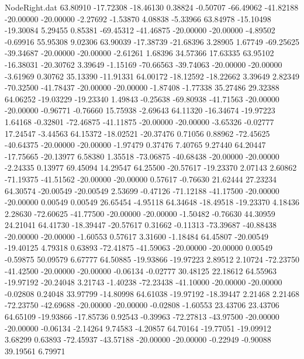 \begin{filecontents}{NodeRight.dat}
  63.80910  -17.72308  -18.46130     0.38824   -0.50707  -66.49062  -41.82188  -20.00000  -20.00000   -2.27692   -1.53870    4.08838   -5.33966
  63.84978  -15.10498  -19.30084     5.29455    0.85381  -69.45312  -41.46875  -20.00000  -20.00000   -4.89502   -0.69916   55.95308    9.02306
  63.90039  -17.38739  -21.68396     3.28905    1.67749  -69.25625  -39.34687  -20.00000  -20.00000   -2.61261    1.68396   34.57366   17.63335
  63.95102  -16.38031  -20.30762     3.39649   -1.15169  -70.66563  -39.74063  -20.00000  -20.00000   -3.61969    0.30762   35.13390  -11.91331
  64.00172  -18.12592  -18.22662     3.39649    2.82349  -70.32500  -41.78437  -20.00000  -20.00000   -1.87408   -1.77338   35.27486   29.32388
  64.06252  -19.03229  -19.23340     1.49843   -0.25638  -69.80938  -41.71563  -20.00000  -20.00000   -0.96771   -0.76660   15.75938   -2.69643
  64.11320  -16.34674  -19.97223     1.64168   -0.32801  -72.46875  -41.11875  -20.00000  -20.00000   -3.65326   -0.02777   17.24547   -3.44563
  64.15372  -18.02521  -20.37476     0.71056    0.88962  -72.45625  -40.64375  -20.00000  -20.00000   -1.97479    0.37476    7.40765    9.27440
  64.20447  -17.75665  -20.13977     6.58380    1.35518  -73.06875  -40.68438  -20.00000  -20.00000   -2.24335    0.13977   69.45094   14.29547
  64.25500  -20.57617  -19.23370     2.07143    2.60862  -71.19375  -41.51562  -20.00000  -20.00000    0.57617   -0.76630   21.62444   27.23234
  64.30574  -20.00549  -20.00549     2.53699   -0.47126  -71.12188  -41.17500  -20.00000  -20.00000    0.00549    0.00549   26.65454   -4.95118
  64.34648  -18.49518  -19.23370     4.18436    2.28630  -72.60625  -41.77500  -20.00000  -20.00000   -1.50482   -0.76630   44.30959   24.21041
  64.41730  -18.39447  -20.57617     0.31662   -0.11313  -73.39687  -40.88438  -20.00000  -20.00000   -1.60553    0.57617    3.31600   -1.18484
  64.45807  -20.00549  -19.40125     4.79318    0.63893  -72.41875  -41.59063  -20.00000  -20.00000    0.00549   -0.59875   50.09579    6.67777
  64.50885  -19.93866  -19.97223     2.89512    2.10724  -72.23750  -41.42500  -20.00000  -20.00000   -0.06134   -0.02777   30.48125   22.18612
  64.55963  -19.97192  -20.24048     3.21743   -1.40238  -72.23438  -41.10000  -20.00000  -20.00000   -0.02808    0.24048   33.97799  -14.80998
  64.61038  -19.97192  -18.39447     2.21468    2.21468  -72.23750  -42.69688  -20.00000  -20.00000   -0.02808   -1.60553   23.43706   23.43706
  64.65109  -19.93866  -17.85736     0.92543   -0.39963  -72.27813  -43.97500  -20.00000  -20.00000   -0.06134   -2.14264    9.74583   -4.20857
  64.70164  -19.77051  -19.09912     3.68299    0.63893  -72.45937  -43.57188  -20.00000  -20.00000   -0.22949   -0.90088   39.19561    6.79971

\end{filecontents}
